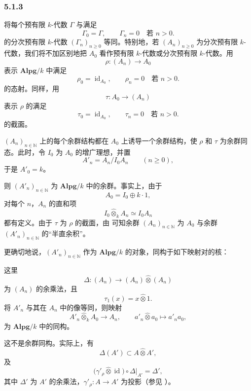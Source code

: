 
\subsubsection*{5.1.3}
\label{sga3:VIIB:5.1.3}

将每个预有限 \(k\)-代数 \(\Gamma\) 与满足
\[
  \Gamma_0=\Gamma,
  \qquad
  \Gamma_n=0\quad\text{若 }n>0.
\]
的分次预有限 \(k\)-代数 \((\Gamma_n)_{n\geq0}\) 等同。特别地，若 \((A_n)_{n\geq0}\) 为分次预有限 \(k\)-代数，我们将不加区别地把 \(A_0\) 看作预有限 \(k\)-代数或分次预有限 \(k\)-代数。用
\[
  \rho:(A_n)\longrightarrow A_0
\]
表示 \(\mathbf{Alpg}/k\) 中满足
\[
  \rho_0=\operatorname{id}_{A_0},
  \qquad
  \rho_n=0\quad\text{若 }n>0.
\]
的态射。同样，用
\[
  \tau:A_0\longrightarrow(A_n)
\]
表示 \(\rho\) 的满足
\[
  \tau_0=\operatorname{id}_{A_0},
  \qquad
  \tau_n=0\quad\text{若 }n>0.
\]
的截面。

\((A_n)_{n\in\mathbb N}\) 上的每个余群结构都在 \(A_0\) 上诱导一个余群结构，使 \(\rho\) 和 \(\tau\) 为余群同态。此时，令 \(I_0\) 为 \(A_0\) 的增广理想，并置
\[
  A'_n=A_n/I_0A_n
  \qquad(n\geq0),
\]
于是 \(A'_0=k\)。

则 \((A'_n)_{n\in\mathbb N}\) 为 \(\mathbf{Alpg}/k\) 中的余群。事实上，由于
\[
  A_0=I_0\oplus k\cdot1,
\]
对每个 \(n\)，\(A_n\) 的直和项
\[
  I_0\widehat\otimes_kA_n\simeq I_0A_n
\]
都有定义。由于 \(\tau\) 为 \(\rho\) 的截面，由  可知余群 \((A_n)_{n\in\mathbb N}\) 为 \(A_0\) 与余群 \((A'_n)_{n\in\mathbb N}\) 的“半直余积”。

更确切地说，\((A'_n)_{n\in\mathbb N}\) 作为 \(\mathbf{Alpg}/k\) 的对象，同构于如下映射对的核：
\begin{center}
  \label{sga3:VIIB:5.1.3:graded-cogroup-kernel-pair}
  
\end{center}
这里
\[
  \Delta:(A_n)\longrightarrow(A_n)\widehat\otimes(A_n)
\]
为 \((A_n)\) 的余乘法，且
\[
  \tau_1(x)=x\widehat\otimes1.
\]
将 \(A'_n\) 与其在 \(A_n\) 中的像等同，则映射
\[
  A'_n\widehat\otimes_kA_0\longrightarrow A_n,
  \qquad
  a'_n\widehat\otimes a_0\longmapsto a'_na_0,
\]
为 \(\mathbf{Alpg}/k\) 中的同构。

这不是余群同构。实际上，有
\[
  \Delta(A')\subset A\widehat\otimes A',
\]
及
\[
  \bigl(\gamma'_\rho\widehat\otimes\operatorname{id}\bigr)
  \circ\Delta\big|_{A'}
  =
  \Delta',
\]
其中 \(\Delta'\) 为 \(A'\) 的余乘法，\(\gamma'_\rho:A\to A'\) 为投影\textup{（参见 ）}。
